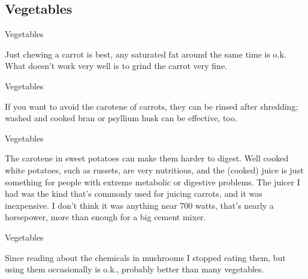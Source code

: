 \documentclass[11pt,oneside,openany,extrafontsizes]{memoir}
\begin{document}
\subsection{Vegetables}

\begin{standalonequote}{Vegetables}

    \begin{answer}
        Just chewing a carrot is best, any saturated fat around the same time is o.k. What doesn't work very well is to grind the carrot very fine.
    \end{answer}
\end{standalonequote}

\begin{standalonequote}{Vegetables}

    \begin{answer}
        If you want to avoid the carotene of carrots, they can be rinsed after shredding; washed and cooked bran or psyllium husk can be effective, too.
    \end{answer}
\end{standalonequote}

\begin{standalonequote}{Vegetables}

    \begin{answer}
        The carotene in sweet potatoes can make them harder to digest. Well cooked white potatoes, such as russets, are very nutritious, and the (cooked) juice is just something for people with extreme metabolic or digestive problems. The juicer I had was the kind that's commonly used for juicing carrots, and it was inexpensive. I don't think it was anything near 700 watts, that's nearly a horsepower, more than enough for a big cement mixer.
    \end{answer}
\end{standalonequote}

\begin{standalonequote}{Vegetables}

    \begin{answer}
        Since reading about the chemicals in mushrooms I stopped eating them, but using them occasionally is o.k., probably better than many vegetables.
    \end{answer}
\end{standalonequote}
\end{document}
